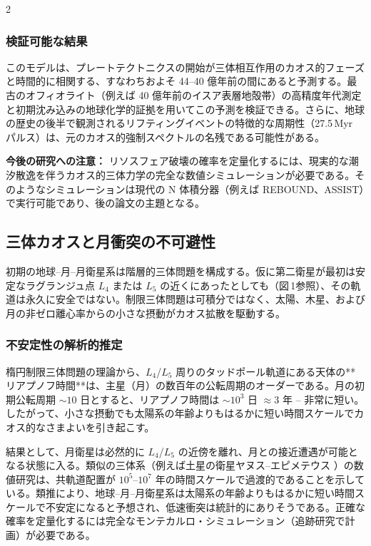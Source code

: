\documentclass[12pt,a4paper]{article}
\begin{document}
\begin{multicols}{2}
		\subsubsection{検証可能な結果}
		このモデルは、プレートテクトニクスの開始が三体相互作用のカオス的フェーズと時間的に相関する、すなわちおよそ 44–40 億年前の間にあると予測する。最古のオフィオライト（例えば 40 億年前のイスア表層地殻帯）の高精度年代測定と初期沈み込みの地球化学的証拠を用いてこの予測を検証できる。さらに、地球の歴史の後半で観測されるリフティングイベントの特徴的な周期性（27.5 Myr パルス）は、元のカオス的強制スペクトルの名残である可能性がある。
		
		\vspace{0.2cm}
		\noindent
		\textbf{今後の研究への注意：} リソスフェア破壊の確率を定量化するには、現実的な潮汐散逸を伴うカオス的三体力学の完全な数値シミュレーションが必要である。そのようなシミュレーションは現代の N 体積分器（例えば REBOUND、ASSIST）で実行可能であり、後の論文の主題となる。
		
		\subsection{三体カオスと月衝突の不可避性}
		初期の地球–月–月衛星系は階層的三体問題を構成する。仮に第二衛星が最初は安定なラグランジュ点 \(L_4\) または \(L_5\) の近くにあったとしても（図 1参照）、その軌道は永久に安全ではない。制限三体問題は可積分ではなく、太陽、木星、および月の非ゼロ離心率からの小さな摂動がカオス拡散を駆動する。
		
		\subsubsection{不安定性の解析的推定}
		楕円制限三体問題の理論から、\(L_4\)/\(L_5\) 周りのタッドポール軌道にある天体の**リアプノフ時間**は、主星（月）の数百年の公転周期のオーダーである。月の初期公転周期 \(\sim 10\) 日とすると、リアプノフ時間は \(\sim 10^{3}\) 日 \(\approx 3\) 年 – 非常に短い。したがって、小さな摂動でも太陽系の年齢よりもはるかに短い時間スケールでカオス的なさまよいを引き起こす。
		
		結果として、月衛星は必然的に \(L_4\)/\(L_5\) の近傍を離れ、月との接近遭遇が可能となる状態に入る。類似の三体系（例えば土星の衛星ヤヌス–エピメテウス \cite{JanusEpimetheus}）の数値研究は、共軌道配置が \(10^{5}\)–\(10^{7}\) 年の時間スケールで過渡的であることを示している。類推により、地球–月–月衛星系は太陽系の年齢よりもはるかに短い時間スケールで不安定になると予想され、低速衝突は統計的にありそうである。正確な確率を定量化するには完全なモンテカルロ・シミュレーション（追跡研究で計画）が必要である。
		

\end{multicols}
\end{document}
